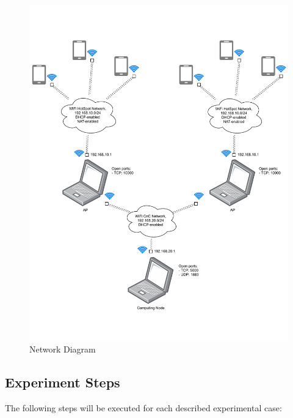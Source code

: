 \begin{figure}[H]
	\centering
	\includegraphics[width=\linewidth, keepaspectratio]{images/Deployment Diagram-Network_Diagram.pdf}
\caption{Network Diagram}
\label{fig:network-diagram}
\end{figure}

\subsection{Experiment Steps}\label{experiment-steps}

The following steps will be executed for each described experimental
case:

